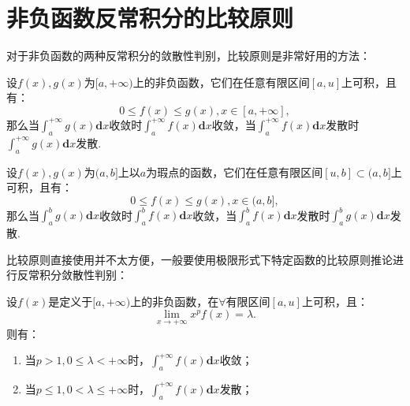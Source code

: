 \section{非负函数反常积分的比较原则}

对于非负函数的两种反常积分的敛散性判别，比较原则是非常好用的方法：

\begin{theorem}[无穷积分比较原则]
	设$f(x),g(x)$为$[a,+\infty)$上的非负函数，它们在任意有限区间$[a,u]$上可积，且有：
	\begin{equation}
		0\leq f(x)\leq g(x),x\in[a,+\infty],
	\end{equation}
	那么当$\int_{a}^{+\infty}g(x)\textbf{d}x$收敛时$\int_{a}^{+\infty}f(x)\textbf{d}x$收敛，当$\int_{a}^{+\infty}f(x)\textbf{d}x$发散时$\int_{a}^{+\infty}g(x)\textbf{d}x$发散.
\end{theorem}


\begin{theorem}[瑕积分比较原则]
	设$f(x),g(x)$为$(a,b]$上以$a$为瑕点的函数，它们在任意有限区间$[u,b]\subset(a,b]$上可积，且有：
	\begin{equation}
		0\leq f(x)\leq g(x),x\in(a,b],
	\end{equation}
	那么当$\int_{a}^{b}g(x)\textbf{d}x$收敛时$\int_{a}^{b}f(x)\textbf{d}x$收敛，当$\int_{a}^{b}f(x)\textbf{d}x$发散时$\int_{a}^{b}g(x)\textbf{d}x$发散.
\end{theorem}


比较原则直接使用并不太方便，一般要使用极限形式下特定函数的比较原则推论进行反常积分敛散性判别：

\begin{corollary}[极限形式下的无穷积分比较原则]
	设$f(x)$是定义于$[a,+\infty)$上的非负函数，在$\forall$有限区间$[a,u]$上可积，且：
	\begin{equation}
		\displaystyle\lim_{x\to +\infty}x^pf(x)=\lambda.
	\end{equation}
	则有：
	\begin{enumerate}
		\item 当$p>1,0\leq\lambda <+\infty$时，$\int_{a}^{+\infty}f(x)\textbf{d}x$收敛；
		\item 当$p\leq 1,0<\lambda\leq +\infty$时，$\int_{a}^{+\infty}f(x)\textbf{d}x$发散；
	\end{enumerate}
\end{corollary}




